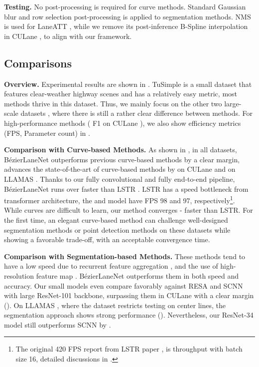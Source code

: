 \documentclass[10pt,twocolumn,letterpaper]{article}
\begin{document}
\noindent \textbf{Testing.} No post-processing is required for curve methods.
Standard Gaussian blur and row selection post-processing is applied to segmentation methods. NMS is used for LaneATT \cite{tabelini2021keep}, while we remove its post-inference B-Spline interpolation in CULane \cite{pan2018spatial}, to align with our framework.



\subsection{Comparisons}
\label{sec:compar}

\noindent \textbf{Overview.} Experimental results are shown in . TuSimple \cite{tusimple} is a small dataset that features clear-weather highway scenes and has a relatively easy metric, most methods thrive in this dataset. Thus, we mainly focus on the other two large-scale datasets \cite{pan2018spatial,llamas2019}, where there is still a rather clear difference between methods. For high-performance methods ( F1 on CULane \cite{pan2018spatial}), we also show efficiency metrics (FPS, Parameter count) in .

\noindent \textbf{Comparison with Curve-based Methods.} As shown in , in all datasets, BézierLaneNet outperforms previous curve-based methods \cite{liu2021end,tabelini2021polylanenet} by a clear margin, advances the state-of-the-art of curve-based methods by  on CULane \cite{pan2018spatial} and  on LLAMAS \cite{llamas2019}. Thanks to our fully convolutional and fully end-to-end pipeline, BézierLaneNet runs over  faster than LSTR \cite{liu2021end}. LSTR has a speed bottleneck from transformer architecture, the  and  model have FPS 98 and 97, respectively\footnote{The original 420 FPS report from LSTR paper \cite{liu2021end}, is throughput with batch size 16, detailed discussions in .}. While curves are difficult to learn, our method converges - faster than LSTR. For the first time, an elegant curve-based method can challenge well-designed segmentation methods or point detection methods on these datasets while showing a favorable trade-off, with an acceptable convergence time.

\noindent \textbf{Comparison with Segmentation-based Methods.} These methods tend to have a low speed due to recurrent feature aggregation \cite{pan2018spatial,zheng2021resa}, and the use of high-resolution feature map \cite{deeplabv1,pan2018spatial,zheng2021resa}. BézierLaneNet outperforms them in both speed and accuracy. Our small models even compare favorably against RESA \cite{zheng2021resa} and SCNN \cite{pan2018spatial} with large ResNet-101 backbone, surpassing them in CULane \cite{pan2018spatial} with a clear margin ().
On LLAMAS \cite{llamas2019}, where the dataset restricts testing on  center lines, the segmentation approach shows strong performance (). Nevertheless, our ResNet-34 model still outperforms SCNN by .
\end{document}
